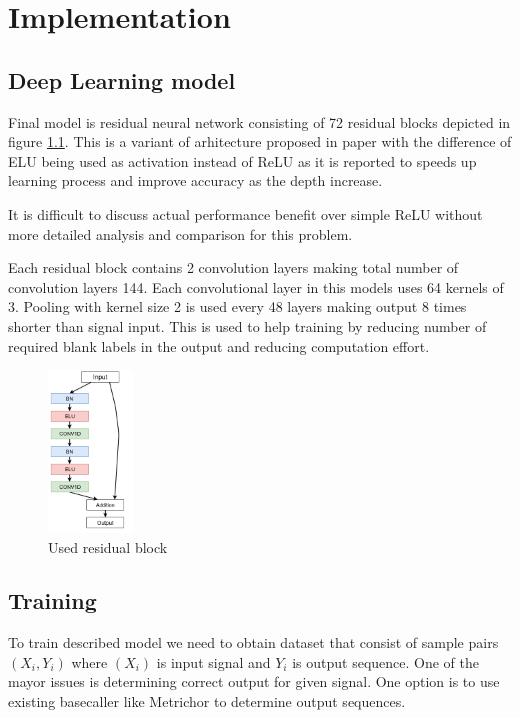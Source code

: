 \documentclass[times, utf8, diplomski, numeric, english]{fer}
\begin{document}
\chapter{Implementation}
\section{Deep Learning model}

Final model is residual neural network consisting of 72 residual blocks depicted in figure \ref{fg:model_block}. This is a variant of arhitecture proposed in paper \cite{identitet} with the difference of ELU being used as activation instead of ReLU as it is reported\cite{resnet-elu} to speeds up learning process and improve accuracy as the depth increase. 



It is difficult to discuss actual performance benefit over simple ReLU without more detailed analysis and comparison for this problem. 

Each residual block contains 2 convolution layers making total number of convolution layers 144. Each convolutional layer in this models uses 64 kernels of 3. Pooling with kernel size 2 is used every 48 layers making output 8 times shorter than signal input. This is used to help training by reducing number of required blank labels in the output and reducing computation effort. 

\begin{figure}[!ht]
	\begin{center}
		\includegraphics[width=0.2\textwidth]{./imgs/model.png}
		\caption{Used residual block}
		\label{fg:model_block}
	\end{center}
\end{figure}


\section{Training}

To train described model we need to obtain dataset that consist of sample pairs $(X_i, Y_i)$ where $(X_i)$ is input signal and $Y_i$ is output sequence. 
One of the mayor issues is determining correct output for given signal. One option is to use existing basecaller like Metrichor to determine output sequences. 
\end{document}

